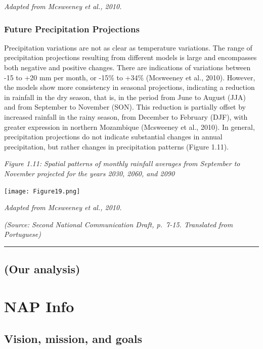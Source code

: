 \documentclass[
]{book}
\begin{document}
\emph{Adapted from Mcsweeney et al., 2010.}

\hypertarget{future-precipitation-projections}{%
\subsection{Future Precipitation Projections}\label{future-precipitation-projections}}

Precipitation variations are not as clear as temperature variations. The range of precipitation projections resulting from different models is large and encompasses both negative and positive changes. There are indications of variations between -15 to +20 mm per month, or -15\% to +34\% (Mcsweeney et al., 2010). However, the models show more consistency in seasonal projections, indicating a reduction in rainfall in the dry season, that is, in the period from June to August (JJA) and from September to November (SON). This reduction is partially offset by increased rainfall in the rainy season, from December to February (DJF), with greater expression in northern Mozambique (Mcsweeney et al., 2010). In general, precipitation projections do not indicate substantial changes in annual precipitation, but rather changes in precipitation patterns (Figure 1.11).

\emph{Figure 1.11: Spatial patterns of monthly rainfall averages from September to November projected for the years 2030, 2060, and 2090}

\texttt{[image: Figure19.png]}

\emph{Adapted from Mcsweeney et al., 2010.}

\emph{(Source: Second National Communication Draft, p.~7-15. Translated from Portuguese)}

\begin{center}\rule{0.5\linewidth}{0.5pt}\end{center}

\hypertarget{our-analysis}{%
\section{(Our analysis)}\label{our-analysis}}

\hypertarget{nap-info}{%
\chapter{NAP Info}\label{nap-info}}

\hypertarget{vision-mission-and-goals}{%
\section{Vision, mission, and goals}\label{vision-mission-and-goals}}
\end{document}
